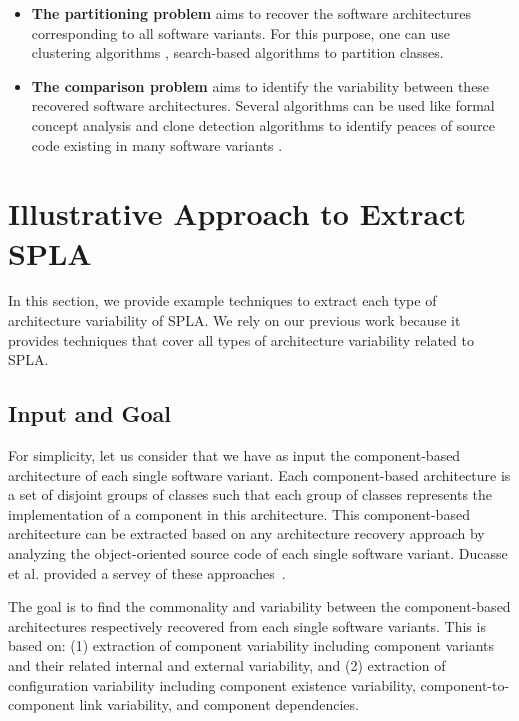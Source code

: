 \documentclass[graybox]{svmult}
\begin{document}
\begin{itemize}
    \begin{itemize}
        \item \textbf{The partitioning problem} aims to recover the software architectures corresponding to all software variants. For this purpose, one can use clustering algorithms \cite{shatnawi2017recovering}, search-based algorithms to partition classes.
        
        \item \textbf{The comparison problem} aims to identify the variability between these recovered software architectures. Several algorithms can be used like formal concept analysis \cite{shatnawi2017recovering} and clone detection algorithms to identify peaces of source code existing in many software variants \cite{koschke2009extending,frenzel2007extending,kolb2006refactoring}.
    \end{itemize}
    
\end{itemize}


\section{Illustrative Approach to Extract SPLA}
\label{sec:example-approach}
In this section, we provide example techniques to extract each type of architecture variability of SPLA. We rely on our previous work \cite{shatnawi2017recovering} because it provides techniques that cover all types of architecture variability related to SPLA. 

\subsection{Input and Goal}

For simplicity, let us consider that we have as input the component-based architecture of each single software variant. Each component-based architecture is a set of disjoint groups of classes such that each group of classes represents the implementation of a component in this architecture. This component-based architecture can be extracted based on any architecture recovery approach by analyzing the object-oriented source code of each single software variant. Ducasse et al. provided a servey of these approaches~\cite{ducasse2009software}. 

The goal is to find the commonality and variability between the component-based architectures respectively recovered from each single software variants. This is based on: (1) extraction of component variability including component variants and their related internal and external variability, and (2) extraction of configuration variability including component existence variability, component-to-component link variability, and component dependencies.
\end{document}
